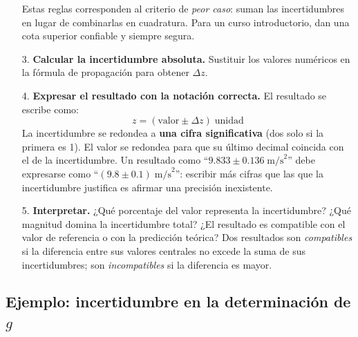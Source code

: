 \documentclass[11pt]{book}
\begin{document}
\begin{enumerate}
    \medskip
    Estas reglas corresponden al criterio de {\it peor caso}: suman las incertidumbres en lugar de combinarlas en cuadratura. Para un curso introductorio, dan una cota superior confiable y siempre segura.

    \item[3.] {\bf Calcular la incertidumbre absoluta.} Sustituir los valores numéricos en la fórmula de propagación para obtener $\Delta z$.

    \item[4.] {\bf Expresar el resultado con la notación correcta.} El resultado se escribe como:
    \[
        z = (\text{valor} \pm \Delta z)\;\text{unidad}
    \]
    La incertidumbre se redondea a {\bf una cifra significativa} (dos solo si la primera es 1). El valor se redondea para que su último decimal coincida con el de la incertidumbre. Un resultado como ``$9.833 \pm 0.136\;\text{m/s}^2$'' debe expresarse como ``$(9.8 \pm 0.1)\;\text{m/s}^2$'': escribir más cifras que las que la incertidumbre justifica es afirmar una precisión inexistente.

    \item[5.] {\bf Interpretar.} ¿Qué porcentaje del valor representa la incertidumbre? ¿Qué magnitud domina la incertidumbre total? ¿El resultado es compatible con el valor de referencia o con la predicción teórica? Dos resultados son {\it compatibles} si la diferencia entre sus valores centrales no excede la suma de sus incertidumbres; son {\it incompatibles} si la diferencia es mayor.
\end{enumerate}

\subsection*{Ejemplo: incertidumbre en la determinación de $g$}
\end{document}
